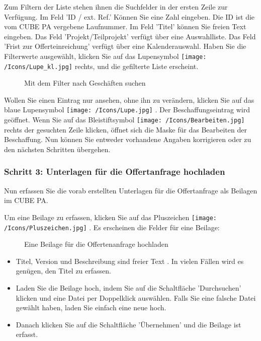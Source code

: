 Zum Filtern der Liste stehen ihnen die Suchfelder in der ersten Zeile zur Verfügung. Im Feld 'ID / ext. Ref.' Können Sie eine Zahl eingeben. Die ID ist die vom CUBE PA vergebene Laufnummer. Im Feld 'Titel' können Sie freien Text eingeben. Das Feld 'Projekt/Teilprojekt' verfügt über eine Auswahlliste. Das Feld 'Frist zur Offerteinreichung' verfügt über eine Kalenderauswahl. Haben Sie die Filterwerte ausgewählt, klicken Sie auf das Lupensymbol \texttt{[image: /Icons/Lupe\_kl.jpg]}  rechts, und die gefilterte Liste erscheint.

\begin{figure}[H]
\caption{Mit dem Filter nach Geschäften suchen}
\end{figure}

Wollen Sie einen Eintrag nur ansehen, ohne ihn zu verändern, klicken Sie auf das blaue Lupensymbol \texttt{[image: /Icons/Lupe.jpg]} . Der Beschaffungseintrag wird geöffnet. Wenn Sie auf das Bleistiftsymbol \texttt{[image: /Icons/Bearbeiten.jpg]}  rechts der gesuchten Zeile klicken, öffnet sich die Maske für das Bearbeiten der Beschaffung.\textcolor{red}{ }Nun können Sie entweder vorhandene Angaben korrigieren oder zu den nächsten Schritten übergehen.

\subsubsection{Schritt 3: Unterlagen für die Offertanfrage hochladen}

Nun erfassen Sie die vorab erstellten Unterlagen für die Offertanfrage als Beilagen im CUBE PA.

\vspace{\baselineskip}

Um eine Beilage zu erfassen, klicken Sie auf das Pluszeichen \texttt{[image: /Icons/Pluszeichen.jpg]} . Es erscheinen die Felder für eine Beilage:

\begin{figure}[H]
\caption{Eine Beilage für die Offertenanfrage hochladen}
\end{figure}

\begin{itemize}
\item
Titel, Version und Beschreibung sind freier Text . In vielen Fällen wird es genügen, den Titel zu erfassen.
\item
Laden Sie die Beilage hoch, indem Sie auf die Schaltfläche 'Durchsuchen'  klicken und eine Datei per Doppelklick auswählen. Falls Sie
eine falsche Datei gewählt haben, laden Sie einfach eine neue hoch.
\item 
Danach klicken Sie auf die Schaltfläche 'Übernehmen'  und die Beilage ist erfasst.
\end{itemize}

